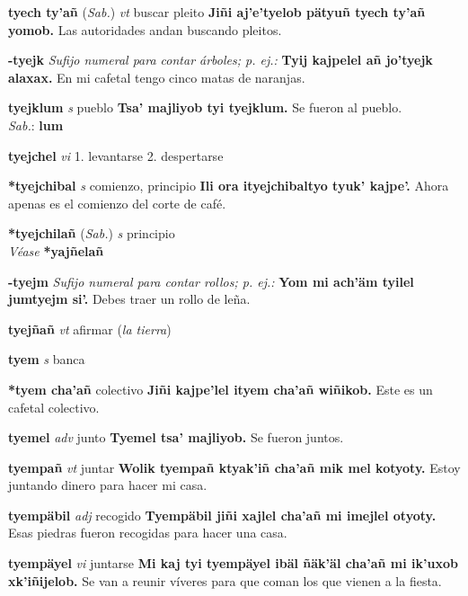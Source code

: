\documentclass[10pt]{scrbook}
\newcommand{\entry}[1]{\textbf{#1}}
\newcommand{\onedefinition}[1]{#1.}
\newcommand{\nontranslationdef}[1]{\textit{#1}}
\newcommand{\partofspeech}[1]{\textit{#1}}
\newcommand{\spanishtranslation}[1]{#1}
\newcommand{\clarification}[1]{(\textit{#1})}
\newcommand{\cholexample}[1]{\textbf{#1}}
\newcommand{\exampletranslation}[1]{#1}
\newcommand{\dialectvariant}[1]{\\\textit{#1}:}
\newcommand{\dialectword}[1]{\textbf{#1}}
\newcommand{\alsosee}[1]{\\\textit{Véase} \textbf{#1}}
\newcommand{\relevantdialect}[1]{(\textit{#1})}
\begin{document}
\begin{multicols}{2}
\entry{tyech ty'añ}
\relevantdialect{Sab.}
\partofspeech{vt}
\spanishtranslation{buscar pleito}
\cholexample{Jiñi aj'e'tyelob pätyuñ tyech ty'añ yomob.}
\exampletranslation{Las autoridades andan buscando pleitos.}

\entry{-tyejk}
\nontranslationdef{Sufijo numeral para contar árboles; p. ej.:}
\cholexample{Tyij kajpelel añ jo'tyejk alaxax.}
\exampletranslation{En mi cafetal tengo cinco matas de naranjas.}

\entry{tyejklum}
\partofspeech{s}
\spanishtranslation{pueblo}
\cholexample{Tsa' majliyob tyi tyejklum.}
\exampletranslation{Se fueron al pueblo.}
\dialectvariant{Sab.}
\dialectword{lum}

\entry{tyejchel}
\partofspeech{vi}
\onedefinition{1}
\spanishtranslation{levantarse}
\onedefinition{2}
\spanishtranslation{despertarse}

\entry{*tyejchibal}
\partofspeech{s}
\spanishtranslation{comienzo, principio}
\cholexample{Ili ora ityejchibaltyo tyuk' kajpe'.}
\exampletranslation{Ahora apenas es el comienzo del corte de café.}

\entry{*tyejchilañ}
\relevantdialect{Sab.}
\partofspeech{s}
\spanishtranslation{principio}
\alsosee{*yajñelañ}

\entry{-tyejm}
\nontranslationdef{Sufijo numeral para contar rollos; p. ej.:}
\cholexample{Yom mi ach'äm tyilel jumtyejm si'.}
\exampletranslation{Debes traer un rollo de leña.}

\entry{tyejñañ}
\partofspeech{vt}
\spanishtranslation{afirmar}
\clarification{la tierra}

\entry{tyem}
\partofspeech{s}
\spanishtranslation{banca}

\entry{*tyem cha'añ}
\spanishtranslation{colectivo}
\cholexample{Jiñi kajpe'lel ityem cha'añ wiñikob.}
\exampletranslation{Este es un cafetal colectivo.}

\entry{tyemel}
\partofspeech{adv}
\spanishtranslation{junto}
\cholexample{Tyemel tsa' majliyob.}
\exampletranslation{Se fueron juntos.}

\entry{tyempañ}
\partofspeech{vt}
\spanishtranslation{juntar}
\cholexample{Wolik tyempañ ktyak'iñ cha'añ mik mel kotyoty.}
\exampletranslation{Estoy juntando dinero para hacer mi casa.}

\entry{tyempäbil}
\partofspeech{adj}
\spanishtranslation{recogido}
\cholexample{Tyempäbil jiñi xajlel cha'añ mi imejlel otyoty.}
\exampletranslation{Esas piedras fueron recogidas para hacer una casa.}

\entry{tyempäyel}
\partofspeech{vi}
\spanishtranslation{juntarse}
\cholexample{Mi kaj tyi tyempäyel ibäl ñäk'äl cha'añ mi ik'uxob xk'iñijelob.}
\exampletranslation{Se van a reunir víveres para que coman los que vienen a la fiesta.}


\end{multicols}
\end{document}
